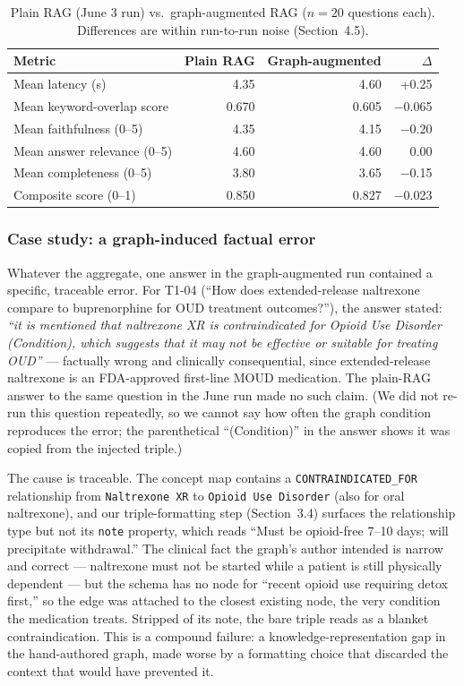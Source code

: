 \documentclass[11pt]{article}
\begin{document}
\begin{table}[h]
\centering
\caption{Plain RAG (June 3 run) vs.\ graph-augmented RAG ($n=20$ questions each). Differences are within run-to-run noise (Section~4.5).}
\label{tab:graphcompare}
\begin{tabular}{lrrr}
\toprule
Metric & Plain RAG & Graph-augmented & $\Delta$ \\
\midrule
Mean latency (s) & 4.35 & 4.60 & +0.25 \\
Mean keyword-overlap score & 0.670 & 0.605 & $-$0.065 \\
Mean faithfulness (0--5) & 4.35 & 4.15 & $-$0.20 \\
Mean answer relevance (0--5) & 4.60 & 4.60 & 0.00 \\
Mean completeness (0--5) & 3.80 & 3.65 & $-$0.15 \\
Composite score (0--1) & 0.850 & 0.827 & $-$0.023 \\
\bottomrule
\end{tabular}
\end{table}

\subsubsection*{Case study: a graph-induced factual error}

Whatever the aggregate, one answer in the graph-augmented run contained a specific, traceable error. For T1-04 (``How does extended-release naltrexone compare to buprenorphine for OUD treatment outcomes?''), the answer stated: \emph{``it is mentioned that naltrexone XR is contraindicated for Opioid Use Disorder (Condition), which suggests that it may not be effective or suitable for treating OUD''} --- factually wrong and clinically consequential, since extended-release naltrexone is an FDA-approved first-line MOUD medication. The plain-RAG answer to the same question in the June run made no such claim. (We did not re-run this question repeatedly, so we cannot say how often the graph condition reproduces the error; the parenthetical ``(Condition)'' in the answer shows it was copied from the injected triple.)

The cause is traceable. The concept map contains a \texttt{CONTRAINDICATED\_FOR} relationship from \texttt{Naltrexone XR} to \texttt{Opioid Use Disorder} (also for oral naltrexone), and our triple-formatting step (Section~3.4) surfaces the relationship type but not its \texttt{note} property, which reads ``Must be opioid-free 7--10 days; will precipitate withdrawal.'' The clinical fact the graph's author intended is narrow and correct --- naltrexone must not be started while a patient is still physically dependent --- but the schema has no node for ``recent opioid use requiring detox first,'' so the edge was attached to the closest existing node, the very condition the medication treats. Stripped of its note, the bare triple reads as a blanket contraindication. This is a compound failure: a knowledge-representation gap in the hand-authored graph, made worse by a formatting choice that discarded the context that would have prevented it.
\end{document}
